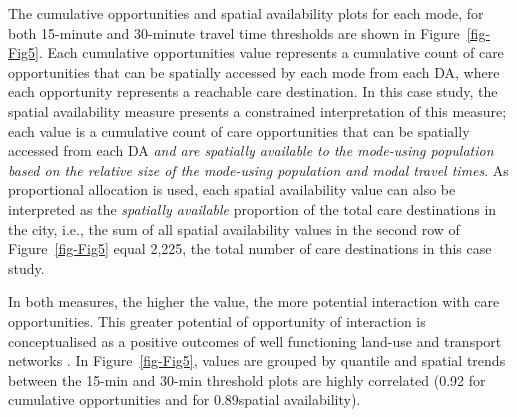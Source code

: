 \documentclass[
  authoryear,
  preprint,
  3p]{elsarticle}
\begin{document}
The cumulative opportunities and spatial availability plots for each
mode, for both 15-minute and 30-minute travel time thresholds are shown
in Figure~\ref{fig-Fig5}. Each cumulative opportunities value represents
a cumulative count of care opportunities that can be spatially accessed
by each mode from each DA, where each opportunity represents a reachable
care destination. In this case study, the spatial availability measure
presents a constrained interpretation of this measure; each value is a
cumulative count of care opportunities that can be spatially accessed
from each DA \emph{and are spatially available to the mode-using
population based on the relative size of the mode-using population and
modal travel times}. As proportional allocation is used, each spatial
availability value can also be interpreted as the \emph{spatially
available} proportion of the total care destinations in the city, i.e.,
the sum of all spatial availability values in the second row of
Figure~\ref{fig-Fig5} equal 2,225, the total number of care destinations
in this case study.

In both measures, the higher the value, the more potential interaction
with care opportunities. This greater potential of opportunity of
interaction is conceptualised as a positive outcomes of well functioning
land-use and transport networks
\citep{corderaImpactAccessibilityPublic2019, blumenbergDriveWorkRelationship2017, cuiSpatialAccessPublic2020}.
In Figure~\ref{fig-Fig5}, values are grouped by quantile and spatial
trends between the 15-min and 30-min threshold plots are highly
correlated (0.92 for cumulative opportunities and for 0.89spatial
availability).
\end{document}

